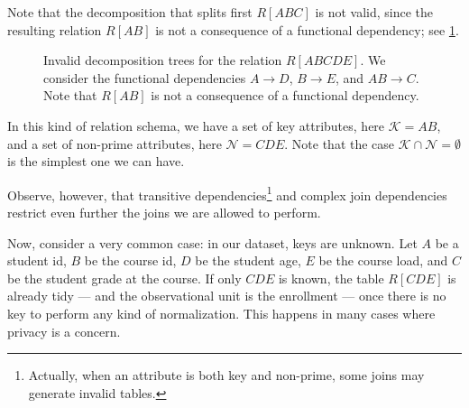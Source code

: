 Note that the decomposition that splits first $R[ABC]$ is not valid, since the resulting
relation $R[AB]$ is not a consequence of a functional dependency; see
\cref{fig:wrongdecomp}.

\begin{figure}
  \centering
  \caption{
  Invalid decomposition trees for the relation $R[ABCDE]$.
  We consider the functional dependencies $A \to D$, $B \to E$, and $AB \to C$.
  Note that $R[AB]$ is not a consequence of a functional dependency.
  }
  \label{fig:wrongdecomp}
\end{figure}

In this kind of relation schema, we have a set of key attributes, here $\mathcal{K} = AB$,
and a set of non-prime attributes, here $\mathcal{N} = CDE$.  Note that the case
$\mathcal{K} \cap \mathcal{N} = \emptyset$ is the simplest one we can have.

Observe, however, that transitive dependencies\footnote{Actually, when an attribute is
both key and non-prime, some joins may generate invalid tables.} and complex join
dependencies restrict even further the joins we are allowed to perform.

Now, consider a very common case: in our dataset, keys are unknown.  Let $A$ be a student
id, $B$ be the course id, $D$ be the student age, $E$ be the course load, and $C$ be the
student grade at the course.  If only $CDE$ is known, the table $R[CDE]$ is already tidy
--- and the observational unit is the enrollment --- once there is no key to perform any
kind of normalization.  This happens in many cases where privacy is a concern.


